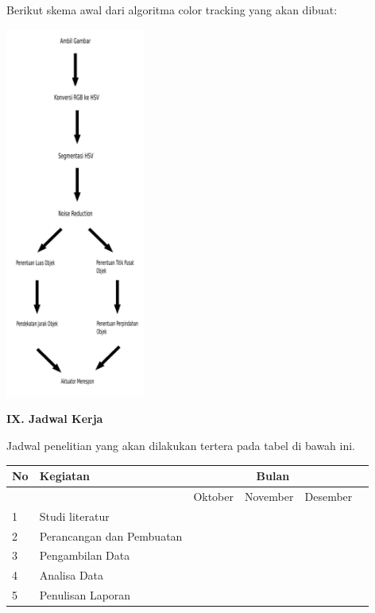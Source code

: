 \documentclass[a4paper,12pt]{article}
\begin{document}
Berikut skema awal dari algoritma color tracking yang akan dibuat:

\begin{center}
 \includegraphics[width=130pt]{ct}
\end{center}

\newpage
\noindent \textbf{IX. \hspace{9pt} Jadwal Kerja}

Jadwal penelitian yang akan dilakukan tertera pada tabel di bawah ini.

\begin{center}
 \begin{tabular}{ |l|l|l|l|l|l| }
   \hline
   No & Kegiatan & \multicolumn{3}{|c|}{Bulan} \\
   \hline
     &  & Oktober & November & Desember \\
   \hline
   1 & Studi literatur & \cellcolor{blue} & \cellcolor{blue} & \\
   \hline
   2 & Perancangan dan Pembuatan & \cellcolor{blue} & \cellcolor{blue} & \\
   \hline
   3 & Pengambilan Data & & \cellcolor{blue} & \cellcolor{blue} \\
   \hline
   4 & Analisa Data & & & \cellcolor{blue} \\
   \hline
   5 & Penulisan Laporan & & \cellcolor{blue} & \cellcolor{blue} \\
  \hline
\end{tabular}
\end{center}
\end{document}
